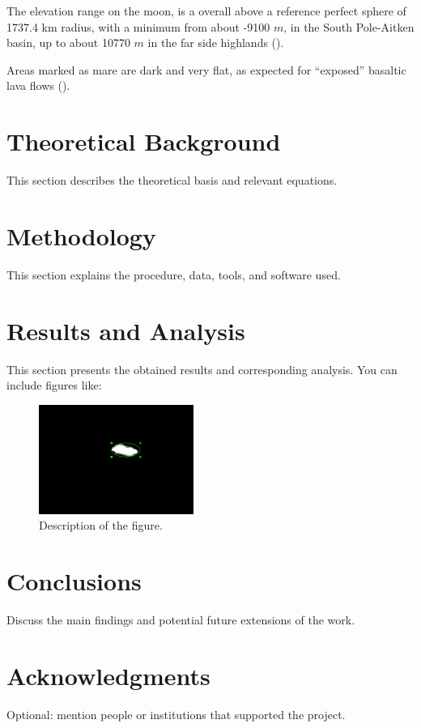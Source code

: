 \documentclass[aps,prd,nofootinbib,superscriptaddress,floatfix,longbibliography,author-year]{revtex4-2}
\begin{document}
The elevation range on the moon, is a overall above a reference perfect sphere of 1737.4 km radius, with a minimum from about -9100 $m$, in the South Pole-Aitken basin, up to about 10770 $m$ in the far side highlands (\citet{JAUMANN201215}).


Areas marked as mare are dark and very flat, as expected for “exposed” basaltic lava flows (\citet{Gibson2011}).
\section{Theoretical Background}
This section describes the theoretical basis and relevant equations.

\section{Methodology}
This section explains the procedure, data, tools, and software used.

\section{Results and Analysis}
This section presents the obtained results and corresponding analysis. You can include figures like:
\begin{figure}[h]
    \centering
    \includegraphics[width=0.45\textwidth]{Images/Ellipse_region.png}
    \caption{Description of the figure.}
    \label{fig:example}
\end{figure}

\section{Conclusions}
Discuss the main findings and potential future extensions of the work.

\section*{Acknowledgments}
Optional: mention people or institutions that supported the project.

\end{document}
